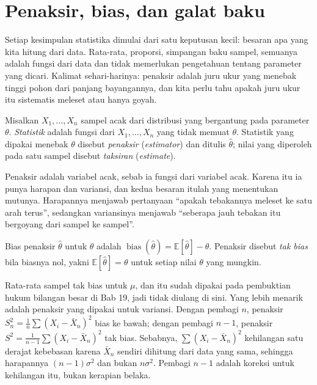 \section{Penaksir, bias, dan galat baku}

Setiap kesimpulan statistika dimulai dari satu keputusan kecil: besaran apa yang kita
hitung dari data. Rata-rata, proporsi, simpangan baku sampel, semuanya adalah fungsi
dari data dan tidak memerlukan pengetahuan tentang parameter yang dicari. Kalimat
sehari-harinya: penaksir adalah juru ukur yang menebak tinggi pohon dari panjang
bayangannya, dan kita perlu tahu apakah juru ukur itu sistematis meleset atau hanya
goyah.


\begin{definisi}
Misalkan $X_1,\dots,X_n$ sampel acak dari distribusi yang bergantung pada parameter
$\theta$. \emph{Statistik} adalah fungsi dari $X_1,\dots,X_n$ yang tidak memuat
$\theta$. Statistik yang dipakai menebak $\theta$ disebut \emph{penaksir}
(\emph{estimator}) dan ditulis $\hat\theta$; nilai yang diperoleh pada satu sampel
disebut \emph{taksiran} (\emph{estimate}).
\end{definisi}

Penaksir adalah variabel acak, sebab ia fungsi dari variabel acak. Karena itu ia punya
harapan dan variansi, dan kedua besaran itulah yang menentukan mutunya. Harapannya
menjawab pertanyaan ``apakah tebakannya meleset ke satu arah terus'', sedangkan
variansinya menjawab ``seberapa jauh tebakan itu bergoyang dari sampel ke sampel''.

\begin{definisi}
Bias penaksir $\hat\theta$ untuk $\theta$ adalah $\operatorname{bias}(\hat\theta)
=\mathbb{E}[\hat\theta]-\theta$. Penaksir disebut \emph{tak bias} bila biasnya nol,
yakni $\mathbb{E}[\hat\theta]=\theta$ untuk setiap nilai $\theta$ yang mungkin.
\end{definisi}

Rata-rata sampel tak bias untuk $\mu$, dan itu sudah dipakai pada pembuktian hukum
bilangan besar di Bab 19, jadi tidak diulang di sini. Yang lebih menarik adalah
penaksir yang dipakai untuk variansi. Dengan pembagi $n$, penaksir
$S_n^2=\frac1n\sum(X_i-\bar X_n)^2$ bias ke bawah; dengan pembagi $n-1$, penaksir
$S^2=\frac1{n-1}\sum(X_i-\bar X_n)^2$ tak bias. Sebabnya, $\sum(X_i-\bar X_n)^2$
kehilangan satu derajat kebebasan karena $\bar X_n$ sendiri dihitung dari data yang
sama, sehingga harapannya $(n-1)\sigma^2$ dan bukan $n\sigma^2$. Pembagi $n-1$
adalah koreksi untuk kehilangan itu, bukan kerapian belaka.

